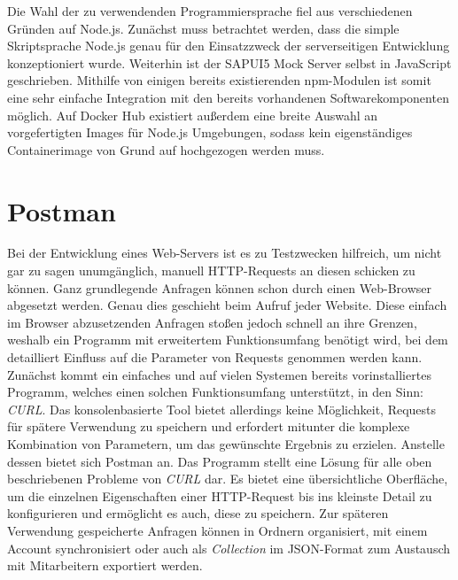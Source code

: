 Die Wahl der zu verwendenden Programmiersprache fiel aus verschiedenen Gründen auf Node.js.
Zunächst muss betrachtet werden, dass die simple Skriptsprache Node.js genau für den Einsatzzweck der serverseitigen Entwicklung konzeptioniert wurde.
Weiterhin ist der SAPUI5 Mock Server selbst in JavaScript geschrieben.
Mithilfe von einigen bereits existierenden \ac{npm}-Modulen ist somit eine sehr einfache Integration mit den bereits vorhandenen Softwarekomponenten möglich.
Auf Docker Hub existiert außerdem eine breite Auswahl an vorgefertigten Images für Node.js Umgebungen, sodass kein eigenständiges Containerimage von Grund auf hochgezogen werden muss.


\section{Postman}
Bei der Entwicklung eines Web-Servers ist es zu Testzwecken hilfreich, um nicht gar zu sagen unumgänglich, manuell \ac{HTTP}-Requests an diesen schicken zu können.
Ganz grundlegende Anfragen können schon durch einen Web-Browser abgesetzt werden.
Genau dies geschieht beim Aufruf jeder Website.
Diese einfach im Browser abzusetzenden Anfragen stoßen jedoch schnell an ihre Grenzen, weshalb ein Programm mit erweitertem Funktionsumfang benötigt wird, bei dem detailliert Einfluss auf die Parameter von Requests genommen werden kann.
Zunächst kommt ein einfaches und auf vielen Systemen bereits vorinstalliertes Programm, welches einen solchen Funktionsumfang unterstützt, in den Sinn: \emph{CURL}.
Das konsolenbasierte Tool bietet allerdings keine Möglichkeit, Requests für spätere Verwendung zu speichern und erfordert mitunter die komplexe Kombination von Parametern, um das gewünschte Ergebnis zu erzielen.
Anstelle dessen bietet sich Postman an.
Das Programm stellt eine Lösung für alle oben beschriebenen Probleme von \emph{CURL} dar.
Es bietet eine übersichtliche Oberfläche, um die einzelnen Eigenschaften einer \ac{HTTP}-Request bis ins kleinste Detail zu konfigurieren und ermöglicht es auch, diese zu speichern.
Zur späteren Verwendung gespeicherte Anfragen können in Ordnern organisiert, mit einem Account synchronisiert oder auch als \emph{Collection} im \ac{JSON}-Format zum Austausch mit Mitarbeitern exportiert werden.

